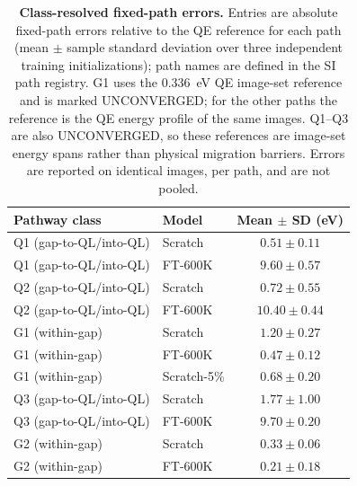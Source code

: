 \begin{table}[htbp]
\centering
\small
\caption{\textbf{Class-resolved fixed-path errors.} Entries are absolute fixed-path errors relative to the QE reference for each path (mean $\pm$ sample standard deviation over three independent training initializations); path names are defined in the SI path registry. G1 uses the 0.336~eV QE image-set reference and is marked UNCONVERGED; for the other paths the reference is the QE energy profile of the same images. Q1--Q3 are also UNCONVERGED, so these references are image-set energy spans rather than physical migration barriers. Errors are reported on identical images, per path, and are not pooled.}
\label{tab:a3_strict_path_errors}
\begin{tabular}{llc}
\toprule
Pathway class & Model & Mean $\pm$ SD (eV) \\
\midrule
Q1 (gap-to-QL/into-QL) & Scratch & $0.51 \pm 0.11$ \\
Q1 (gap-to-QL/into-QL) & FT-600K & $9.60 \pm 0.57$ \\
Q2 (gap-to-QL/into-QL) & Scratch & $0.72 \pm 0.55$ \\
Q2 (gap-to-QL/into-QL) & FT-600K & $10.40 \pm 0.44$ \\
G1 (within-gap) & Scratch & $1.20 \pm 0.27$ \\
G1 (within-gap) & FT-600K & $0.47 \pm 0.12$ \\
G1 (within-gap) & Scratch-5\% & $0.68 \pm 0.20$ \\
Q3 (gap-to-QL/into-QL) & Scratch & $1.77 \pm 1.00$ \\
Q3 (gap-to-QL/into-QL) & FT-600K & $9.70 \pm 0.20$ \\
G2 (within-gap) & Scratch & $0.33 \pm 0.06$ \\
G2 (within-gap) & FT-600K & $0.21 \pm 0.18$ \\
\bottomrule
\end{tabular}
\end{table}
